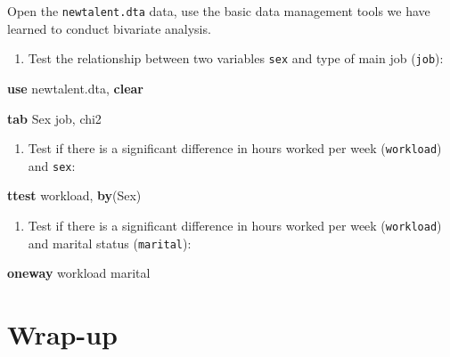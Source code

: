 \documentclass[
]{book}
\newenvironment{Shaded}{\begin{snugshade}}{\end{snugshade}}
\newcommand{\FunctionTok}[1]{\textcolor[rgb]{0.00,0.00,0.00}{#1}}
\newcommand{\KeywordTok}[1]{\textcolor[rgb]{0.13,0.29,0.53}{\textbf{#1}}}
\newcommand{\NormalTok}[1]{#1}
\providecommand{\tightlist}{%
  \setlength{\itemsep}{0pt}\setlength{\parskip}{0pt}}
\begin{document}
\begin{alert}

Open the \texttt{newtalent.dta} data, use the basic data management tools we have learned to conduct bivariate analysis.

\begin{enumerate}
\def\labelenumi{\arabic{enumi}.}
\tightlist
\item
  Test the relationship between two variables \texttt{sex} and type of main job (\texttt{job}):
\end{enumerate}

\begin{Shaded}
\begin{Highlighting}[]
\KeywordTok{use}\NormalTok{ newtalent.dta, }\KeywordTok{clear} 

\KeywordTok{tab}\NormalTok{ Sex job, }\FunctionTok{chi2} 
\end{Highlighting}
\end{Shaded}

\begin{enumerate}
\def\labelenumi{\arabic{enumi}.}
\setcounter{enumi}{1}
\tightlist
\item
  Test if there is a significant difference in hours worked per week (\texttt{workload}) and \texttt{sex}:
\end{enumerate}

\begin{Shaded}
\begin{Highlighting}[]
\KeywordTok{ttest}\NormalTok{ workload, }\KeywordTok{by}\NormalTok{(Sex)}
\end{Highlighting}
\end{Shaded}

\begin{enumerate}
\def\labelenumi{\arabic{enumi}.}
\setcounter{enumi}{2}
\tightlist
\item
  Test if there is a significant difference in hours worked per week (\texttt{workload}) and marital status (\texttt{marital}):
\end{enumerate}

\begin{Shaded}
\begin{Highlighting}[]
\KeywordTok{oneway}\NormalTok{ workload marital }
\end{Highlighting}
\end{Shaded}

\end{alert}

\hypertarget{wrap-up-7}{%
\section{Wrap-up}\label{wrap-up-7}}
\end{document}
